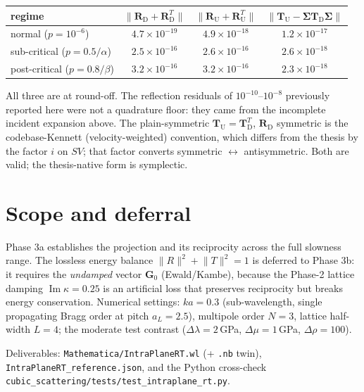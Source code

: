 \documentclass[11pt]{article}
\newcommand{\Rd}{\mathbf{R}_{\mathrm D}}
\newcommand{\Ru}{\mathbf{R}_{\mathrm U}}
\newcommand{\Td}{\mathbf{T}_{\mathrm D}}
\newcommand{\Tu}{\mathbf{T}_{\mathrm U}}
\begin{document}
\begin{center}
\begin{tabular}{lccc}
\toprule
regime & $\lVert\Rd+\Rd^{T}\rVert$ & $\lVert\Ru+\Ru^{T}\rVert$ & $\lVert\Tu-\boldsymbol\Sigma\Td\boldsymbol\Sigma\rVert$\\
\midrule
normal ($p=10^{-6}$)            & $4.7\times10^{-19}$ & $4.9\times10^{-18}$ & $1.2\times10^{-17}$\\
sub-critical ($p=0.5/\alpha$)   & $2.5\times10^{-16}$ & $2.6\times10^{-16}$ & $2.6\times10^{-18}$\\
post-critical ($p=0.8/\beta$)   & $3.2\times10^{-16}$ & $3.2\times10^{-16}$ & $2.3\times10^{-18}$\\
\bottomrule
\end{tabular}
\end{center}

All three are at round-off. The reflection residuals of $10^{-10}$--$10^{-8}$ previously
reported here were not a quadrature floor: they came from the incomplete incident expansion above. The plain-symmetric $\Tu=\Td^{T}$, $\Rd$ symmetric is the
codebase-Kennett (velocity-weighted) convention, which differs from the thesis by the factor $i$ on $SV$;
that factor converts symmetric $\leftrightarrow$ antisymmetric. Both are valid; the thesis-native form is
symplectic.

\section{Scope and deferral}
Phase 3a establishes the projection and its reciprocity across the full slowness range. The lossless
energy balance $\lVert R\rVert^2+\lVert T\rVert^2=1$ is deferred to Phase 3b: it requires the
\emph{undamped} vector $\mathbf{G}_0$ (Ewald/Kambe), because the Phase-2 lattice damping
$\operatorname{Im}\kappa=0.25$ is an artificial loss that preserves reciprocity but breaks energy
conservation. Numerical settings: $ka=0.3$ (sub-wavelength, single propagating Bragg order at pitch
$a_L=2.5$), multipole order $N=3$, lattice half-width $L=4$; the moderate test contrast
($\Delta\lambda=2$\,GPa, $\Delta\mu=1$\,GPa, $\Delta\rho=100$).

Deliverables: \texttt{Mathematica/IntraPlaneRT.wl} (+ \texttt{.nb} twin),
\texttt{IntraPlaneRT\_reference.json}, and the Python cross-check
\texttt{cubic\_scattering/tests/test\_intraplane\_rt.py}.
\end{document}
